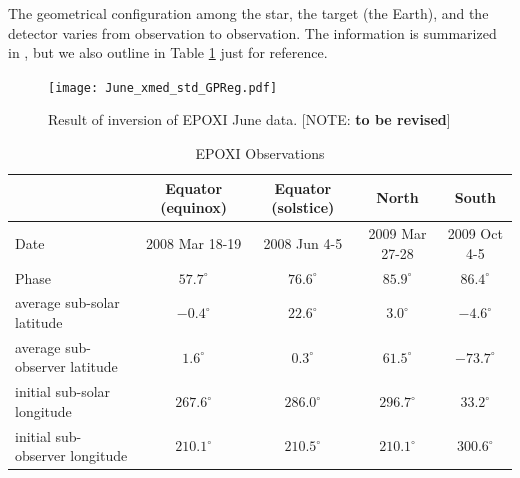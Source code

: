 \documentclass[iop,numberedappendix,apj,]{emulateapj}
\def\memoYF#1{\color{red}[NOTE: {\bf #1}]\color{black}}
\begin{document}
The geometrical configuration among the star, the target (the Earth), and the detector varies from observation to observation. 
The information is summarized in \citet{Cowan2011}, but we also outline in Table \ref{tab:EPOXI} just for reference. 

\begin{figure}[!bt]
    \begin{center}
    \texttt{[image: June\_xmed\_std\_GPReg.pdf]}
    \end{center}
    \caption{Result of inversion of EPOXI June data. \memoYF{to be revised}}
\label{fig:mcmc_June_tmp}
\end{figure}

\begin{table}[htp]
\caption{EPOXI Observations}
\begin{center}
\begin{tabular}{lcccc} \hline \hline
& Equator (equinox) & Equator (solstice) & North & South \\ \hline
Date & 2008 Mar 18-19 & 2008 Jun 4-5 & 2009 Mar 27-28 & 2009 Oct 4-5 \\ 
Phase & $57.7^{\circ }$ & $76.6^{\circ }$ & $85.9^{\circ }$ & $86.4^{\circ }$ \\ 
average sub-solar latitude & $-0.4^{\circ }$ & $22.6^{\circ }$ & $3.0^{\circ }$ & $-4.6^{\circ }$ \\
average sub-observer latitude & $1.6^{\circ }$ & $0.3^{\circ }$ & $61.5^{\circ }$ & $-73.7^{\circ }$  \\
initial sub-solar longitude & $267.6^{\circ }$ & $286.0^{\circ }$ & $296.7^{\circ }$ & $33.2^{\circ }$ \\
initial sub-observer longitude & $210.1^{\circ }$ & $210.5^{\circ }$ & $210.1^{\circ }$ & $300.6^{\circ }$ \\ \hline
\end{tabular}
\end{center}
\label{tab:EPOXI}
\end{table}%
\end{document}
